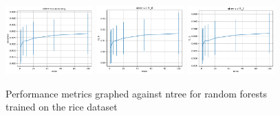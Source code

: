 \begin{figure}
    \centering
    \includegraphics[width=0.30\textwidth]{figures/rice_random_forest_accuracy.pdf}
    \includegraphics[width=0.30\textwidth]{figures/rice_random_forest_f1_0.pdf}
    \includegraphics[width=0.30\textwidth]{figures/rice_random_forest_f1_1.pdf}
    \caption{Performance metrics graphed against ntree for random forests trained on the rice
             dataset}
    \label{fig:rice_random_forest}
\end{figure}

